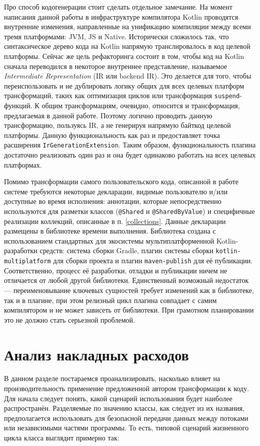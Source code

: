 \documentclass[specification,annotation,times]{itmo-student-thesis}
\begin{document}
Про способ кодогенерации стоит сделать отдельное замечание. На момент написания данной работы в инфраструктуре компилятора Kotlin проводятся внутренние изменения, направленные на унификацию компиляции между всеми тремя платформами: JVM, JS и Native.
Исторически сложилось так, что синтаксическое дерево кода на Kotlin напрямую транслировалось в код целевой платформы. Сейчас же цель рефакторинга состоит в том, чтобы код на Kotlin сначала переводился в некоторое внутреннее представление, называемое \textit{Intermediate Representation} (IR или backend IR). Это делается для того, чтобы переиспользовать и не дублировать логику общих для всех целевых платформ трансформаций, таких как оптимизация циклов или трансформация \texttt{suspend}-функций.
К общим трансформациям, очевидно, относится и трансформация, предлагаемая в данной работе. Поэтому логично проводить данную трансформацию, пользуясь IR, а не генерируя напрямую байткод целевой платформы. Данную функциональность как раз и предоставляет точка расширения \texttt{IrGenerationExtension}. Таким образом, функциональность плагина достаточно реализовать один раз и она будет одинаково работать на всех целевых платформах.

Помимо трансформации самого пользовательского кода, описанной в работе системе требуются некоторые декларации, видимые пользователю и/или доступные во время исполнения: аннотации, которые непосредственно используются для разметки классов (\texttt{@Shared} и \texttt{@SharedByValue}) и специфичные реализации коллекций, описанные в п. \ref{collections}.
Данные декларации размещены в библиотеке времени выполнения. Библиотека создана с использованием стандартных для экосистемы мультиплатформенной Kotlin-разработки средств: система сборки Gradle, плагин системы сборки \texttt{kotlin-multiplatform} для сборки проекта и плагин \texttt{maven-publish} для её публикации.
Соответственно, процесс её разработки, отладки и публикации ничем не отличается от любой другой библиотеки.
Единственный возможный недостаток --- переименовывание ключевых сущностей требует изменений как в библиотеке, так и в плагине, при этом релизный цикл плагина совпадает с самим компилятором и не может зависеть от библиотеки. При грамотном планировании это не должно стать серьезной проблемой.

\section{Анализ накладных расходов}

В данном разделе постараемся проанализировать, насколько влияет на производительность применение предложенной автором трансформации к коду.
Для начала следует понять, какой сценарий использования будет наиболее распространён.
Разделяемые по значению классы, как следует из их названия, предполагается использовать для безопасной передачи данных между потоками или независимыми частями программы. То есть, типовой сценарий жизненного цикла класса выглядит примерно так:
\end{document}

